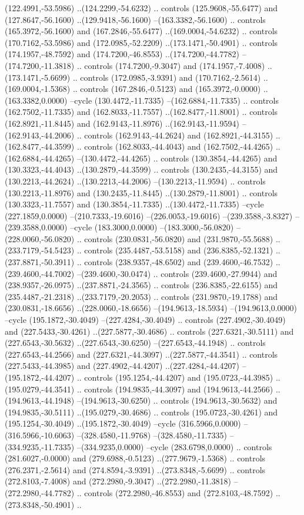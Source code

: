 \begin{scope}[shift={(55,258)}]
(122.4991,-53.5986) ..(124.2299,-54.6232) .. controls (125.9608,-55.6477) and (127.8647,-56.1600) ..(129.9418,-56.1600) --(163.3382,-56.1600) .. controls (165.3972,-56.1600) and (167.2846,-55.6477) ..(169.0004,-54.6232) .. controls (170.7162,-53.5986) and (172.0985,-52.2209) ..(173.1471,-50.4901) .. controls (174.1957,-48.7592) and (174.7200,-46.8553) ..(174.7200,-44.7782) --(174.7200,-11.3818) .. controls (174.7200,-9.3047) and (174.1957,-7.4008) ..(173.1471,-5.6699) .. controls (172.0985,-3.9391) and (170.7162,-2.5614) ..(169.0004,-1.5368) .. controls (167.2846,-0.5123) and (165.3972,-0.0000) ..(163.3382,0.0000) --cycle (130.4472,-11.7335) --(162.6884,-11.7335) .. controls (162.7502,-11.7335) and (162.8033,-11.7557) ..(162.8477,-11.8001) .. controls (162.8921,-11.8445) and (162.9143,-11.8976) ..(162.9143,-11.9594) --(162.9143,-44.2006) .. controls (162.9143,-44.2624) and (162.8921,-44.3155) ..(162.8477,-44.3599) .. controls (162.8033,-44.4043) and (162.7502,-44.4265) ..(162.6884,-44.4265) --(130.4472,-44.4265) .. controls (130.3854,-44.4265) and (130.3323,-44.4043) ..(130.2879,-44.3599) .. controls (130.2435,-44.3155) and (130.2213,-44.2624) ..(130.2213,-44.2006) --(130.2213,-11.9594) .. controls (130.2213,-11.8976) and (130.2435,-11.8445) ..(130.2879,-11.8001) .. controls (130.3323,-11.7557) and (130.3854,-11.7335) ..(130.4472,-11.7335) --cycle (227.1859,0.0000) --(210.7333,-19.6016) --(226.0053,-19.6016) --(239.3588,-3.8327) --(239.3588,0.0000) --cycle (183.3000,0.0000) --(183.3000,-56.0820) --(228.0060,-56.0820) .. controls (230.0831,-56.0820) and (231.9870,-55.5688) ..(233.7179,-54.5423) .. controls (235.4487,-53.5158) and (236.8385,-52.1321) ..(237.8871,-50.3911) .. controls (238.9357,-48.6502) and (239.4600,-46.7532) ..(239.4600,-44.7002) --(239.4600,-30.0474) .. controls (239.4600,-27.9944) and (238.9357,-26.0975) ..(237.8871,-24.3565) .. controls (236.8385,-22.6155) and (235.4487,-21.2318) ..(233.7179,-20.2053) .. controls (231.9870,-19.1788) and (230.0831,-18.6656) ..(228.0060,-18.6656) --(194.9613,-18.5934) --(194.9613,0.0000) --cycle (195.1872,-30.4049) --(227.4284,-30.4049) .. controls (227.4902,-30.4049) and (227.5433,-30.4261) ..(227.5877,-30.4686) .. controls (227.6321,-30.5111) and (227.6543,-30.5632) ..(227.6543,-30.6250) --(227.6543,-44.1948) .. controls (227.6543,-44.2566) and (227.6321,-44.3097) ..(227.5877,-44.3541) .. controls (227.5433,-44.3985) and (227.4902,-44.4207) ..(227.4284,-44.4207) --(195.1872,-44.4207) .. controls (195.1254,-44.4207) and (195.0723,-44.3985) ..(195.0279,-44.3541) .. controls (194.9835,-44.3097) and (194.9613,-44.2566) ..(194.9613,-44.1948) --(194.9613,-30.6250) .. controls (194.9613,-30.5632) and (194.9835,-30.5111) ..(195.0279,-30.4686) .. controls (195.0723,-30.4261) and (195.1254,-30.4049) ..(195.1872,-30.4049) --cycle (316.5966,0.0000) --(316.5966,-10.6063) --(328.4580,-11.9768) --(328.4580,-11.7335) --(334.9235,-11.7335) --(334.9235,0.0000) --cycle (283.6798,0.0000) .. controls (281.6027,-0.0000) and (279.6988,-0.5123) ..(277.9679,-1.5368) .. controls (276.2371,-2.5614) and (274.8594,-3.9391) ..(273.8348,-5.6699) .. controls (272.8103,-7.4008) and (272.2980,-9.3047) ..(272.2980,-11.3818) --(272.2980,-44.7782) .. controls (272.2980,-46.8553) and (272.8103,-48.7592) ..(273.8348,-50.4901) .. 
\end{scope}
